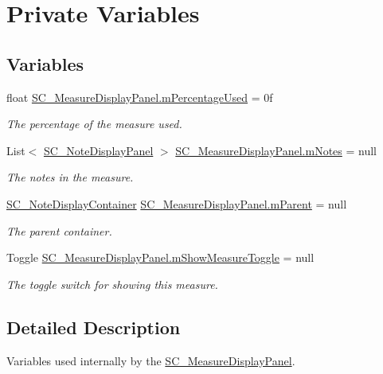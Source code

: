 \hypertarget{group___s_c___m_d_p_priv_var}{}\section{Private Variables}
\label{group___s_c___m_d_p_priv_var}
\subsection*{Variables}
\begin{DoxyCompactItemize}
\item 
float \hyperlink{group___s_c___m_d_p_priv_var_ga7567e9001016a06d950b9d0cc9e1d905}{S\+C\+\_\+\+Measure\+Display\+Panel.\+m\+Percentage\+Used} = 0f
\begin{DoxyCompactList}\small\item\em The percentage of the measure used. \end{DoxyCompactList}\item 
List$<$ \hyperlink{class_s_c___note_display_panel}{S\+C\+\_\+\+Note\+Display\+Panel} $>$ \hyperlink{group___s_c___m_d_p_priv_var_gaf8a533bce87e58d8f7a1da88f476ac6f}{S\+C\+\_\+\+Measure\+Display\+Panel.\+m\+Notes} = null
\begin{DoxyCompactList}\small\item\em The notes in the measure. \end{DoxyCompactList}\item 
\hyperlink{class_s_c___note_display_container}{S\+C\+\_\+\+Note\+Display\+Container} \hyperlink{group___s_c___m_d_p_priv_var_ga6f22ae359dd68605a8b2fd961ced96b5}{S\+C\+\_\+\+Measure\+Display\+Panel.\+m\+Parent} = null
\begin{DoxyCompactList}\small\item\em The parent container. \end{DoxyCompactList}\item 
Toggle \hyperlink{group___s_c___m_d_p_priv_var_gabec551ab0b79d269b028f4bc99e82b00}{S\+C\+\_\+\+Measure\+Display\+Panel.\+m\+Show\+Measure\+Toggle} = null
\begin{DoxyCompactList}\small\item\em The toggle switch for showing this measure. \end{DoxyCompactList}\end{DoxyCompactItemize}


\subsection{Detailed Description}
Variables used internally by the \hyperlink{class_s_c___measure_display_panel}{S\+C\+\_\+\+Measure\+Display\+Panel}. 

